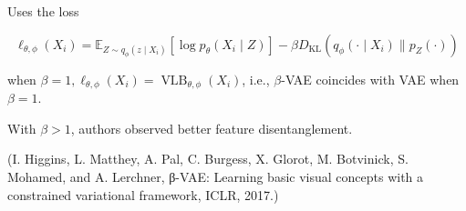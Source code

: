 \begin{concept}
    Uses the loss

    $$
    \ell_{\theta, \phi}\left(X_{i}\right)=\mathbb{E}_{Z \sim q_{\phi}\left(z \mid X_{i}\right)}\left[\log p_{\theta}\left(X_{i} \mid Z\right)\right]-\beta D_{\mathrm{KL}}\left(q_{\phi}\left(\cdot \mid X_{i}\right) \| p_{Z}(\cdot)\right)
    $$

    when $\beta=1, \ell_{\theta, \phi}\left(X_{i}\right)=\operatorname{VLB}_{\theta, \phi}\left(X_{i}\right)$, i.e., $\beta$-VAE coincides with VAE when $\beta=1$.

    With $\beta>1$, authors observed better feature disentanglement.

    (I. Higgins, L. Matthey, A. Pal, C. Burgess, X. Glorot, M. Botvinick, S. Mohamed, and A. Lerchner, β-VAE: Learning basic visual concepts with a constrained variational framework, ICLR, 2017.)
\end{concept}
